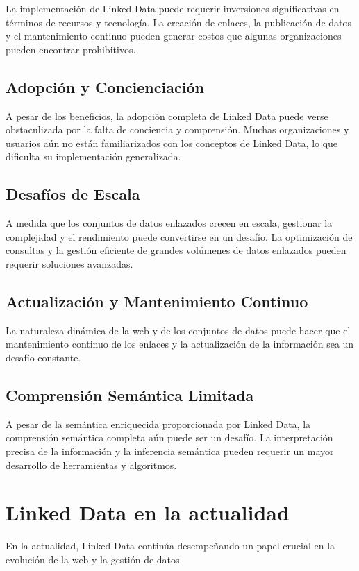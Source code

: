 \documentclass[11pt]{report}
\begin{document}
		La implementación de Linked Data puede requerir inversiones significativas en términos de recursos y tecnología. La creación de enlaces, la publicación de datos y el mantenimiento continuo pueden generar costos que algunas organizaciones pueden encontrar prohibitivos.
\section{Adopción y Concienciación}

		A pesar de los beneficios, la adopción completa de Linked Data puede verse obstaculizada por la falta de conciencia y comprensión. Muchas organizaciones y usuarios aún no están familiarizados con los conceptos de Linked Data, lo que dificulta su implementación generalizada.
\section{Desafíos de Escala}

		A medida que los conjuntos de datos enlazados crecen en escala, gestionar la complejidad y el rendimiento puede convertirse en un desafío. La optimización de consultas y la gestión eficiente de grandes volúmenes de datos enlazados pueden requerir soluciones avanzadas.
\section{Actualización y Mantenimiento Continuo}

		La naturaleza dinámica de la web y de los conjuntos de datos puede hacer que el mantenimiento continuo de los enlaces y la actualización de la información sea un desafío constante.
\section{Comprensión Semántica Limitada}

		A pesar de la semántica enriquecida proporcionada por Linked Data, la comprensión semántica completa aún puede ser un desafío. La interpretación precisa de la información y la inferencia semántica pueden requerir un mayor desarrollo de herramientas y algoritmos.

\chapter{Linked Data en la actualidad}
En la actualidad, Linked Data continúa desempeñando un papel crucial en la evolución de la web y la gestión de datos.
\end{document}
